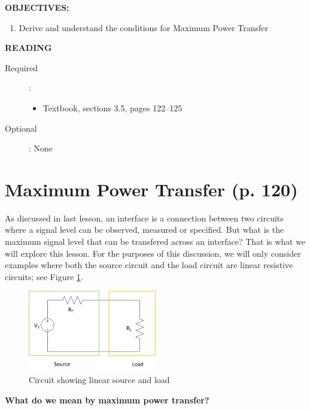 \documentclass{handout}
\begin{document}
\maketitle


\textbf{OBJECTIVES:}
\begin{enumerate}
\item Derive and understand the conditions for Maximum Power Transfer
\end{enumerate}

\textbf{READING}
\begin{description}
\item [Required]:
\begin{itemize}
\item  Textbook, sections 3.5, pages 122--125
\end{itemize}
\item [Optional]: None
\end{description}


\section{Maximum Power Transfer (p. 120)}
As discussed in last lesson, an interface is a connection between two circuits where a signal level can be observed, measured or specified.  But what is the maximum signal level that can be transfered across an interface?  That is what we will explore this lesson.  For the purposes of this discussion, we will only consider examples where both the source circuit and the load circuit are linear resistive circuits; see Figure \ref{fig: Source_Load}.
\begin{figure} [h t b]
\centering
\includegraphics[width=0.5\textwidth]{Source_Load.jpg}
\caption{Circuit showing linear source and load}
\label{fig: Source_Load}
\end{figure}

\textbf{What do we mean by maximum power transfer?}

\end{document}
